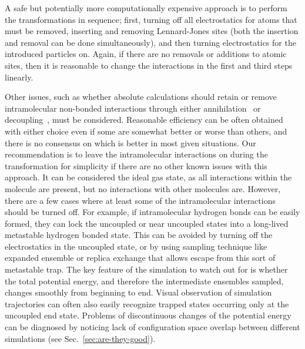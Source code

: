 \documentclass[9pt,bestpractices]{livecoms}
\begin{document}
A safe but potentially more computationally expensive approach is to perform the transformations in sequence; first, turning off all electrostatics for atoms that must be removed, inserting and removing Lennard-Jones sites (both the insertion and removal can be done simultaneously), and then turning electrostatics for the introduced particles on. Again, if there are no removals or additions to atomic sites, then it is reasonable to change the interactions in the first and third steps  linearly. 

Other issues, such as whether absolute calculations should retain or remove intramolecular non-bonded interactions
through either annihilation~\cite{hermans1997inclusion, mann2000modeling, boresch2003absolute, wang2006absolute, mobley2006use} or decoupling~\cite{fujitani2005direct, mobley2006use}, must be considered. Reasonable efficiency can be often obtained with either choice even if some are somewhat better or worse than others, and there is no consensus on which is better in most given situations. Our recommendation is to leave the intramolecular interactions on during the transformation for simplicity if there are no other known issues with this approach.  It can be considered the ideal gas state, as all interactions within the molecule are present, but no interactions with other molecules are.  However, there are a few cases where at least some of the intramolecular interactions should be turned off.  For example, if intramolecular hydrogen bonds can be easily formed, they can lock the uncoupled or near uncoupled states into a long-lived metastable hydrogen bonded state.  This can be avoided by turning off the electrostatics in the uncoupled state, or by using sampling technique like expanded ensemble or replica exchange that allows escape from this sort of metastable trap.  The key feature of the simulation to watch out for is whether the total potential energy, and therefore the intermediate ensembles sampled, changes smoothly from beginning to end.  Visual observation of simulation trajectories can often also easily recognize trapped states occurring only at the uncoupled end state. Problems of discontinuous changes of the potential energy can be diagnosed by noticing lack of configuration space overlap between different simulations (see Sec.~\ref{sec:are-they-good}).
\end{document}
